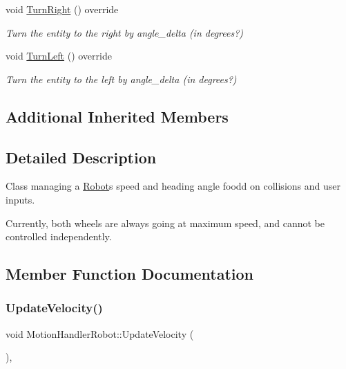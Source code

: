 \begin{DoxyCompactItemize}
\mbox{\label{class_motion_handler_robot_a4b18204b7c7f7f8a3cbb7f0e8ccf088f}} 
void \mbox{\hyperlink{class_motion_handler_robot_a4b18204b7c7f7f8a3cbb7f0e8ccf088f}{Turn\+Right}} () override
\begin{DoxyCompactList}\small\item\em Turn the entity to the right by angle\+\_\+delta (in degrees?) \end{DoxyCompactList}\item 
\mbox{\label{class_motion_handler_robot_a955ca2693c4188ffb08cfde469e58252}} 
void \mbox{\hyperlink{class_motion_handler_robot_a955ca2693c4188ffb08cfde469e58252}{Turn\+Left}} () override
\begin{DoxyCompactList}\small\item\em Turn the entity to the left by angle\+\_\+delta (in degrees?) \end{DoxyCompactList}\end{DoxyCompactItemize}
\subsection*{Additional Inherited Members}


\subsection{Detailed Description}
Class managing a \mbox{\hyperlink{class_robot}{Robot}}\textquotesingle{}s speed and heading angle foodd on collisions and user inputs. 

Currently, both wheels are always going at maximum speed, and cannot be controlled independently. 

\subsection{Member Function Documentation}
\mbox{\label{class_motion_handler_robot_acd2cdb615d806dcf809142e84569ca9d}} 
\subsubsection{\texorpdfstring{Update\+Velocity()}{UpdateVelocity()}}
{\footnotesize\ttfamily void Motion\+Handler\+Robot\+::\+Update\+Velocity (\begin{DoxyParamCaption}{ }\end{DoxyParamCaption})\hspace{0.3cm}{\ttfamily [override]}, {\ttfamily [virtual]}}



